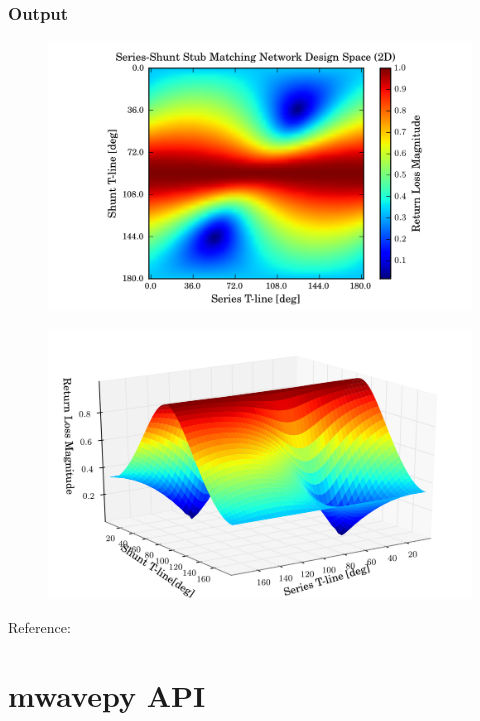 \documentclass[letterpaper,10pt,english]{sphinxmanual}
\begin{document}
\subsection{Output}
\label{examples/matching_single_stub:output}\begin{figure}[htbp]
\centering

\includegraphics{Series-Shunt_Stub_Matching_2D.png}
\end{figure}
\begin{figure}[htbp]
\centering

\includegraphics{Series-Shunt_Stub_Matching_3D.png}
\end{figure}

Reference:


\chapter{mwavepy API}
\label{api/modules::doc}\label{api/modules:mwavepy-api}
\end{document}

